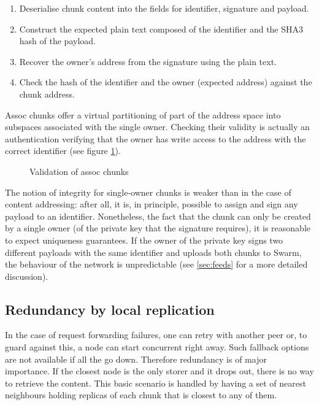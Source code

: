 \begin{enumerate}
    \item Deserialise chunk content into the fields for identifier, signature and payload.
    \item Construct the expected plain text composed of the identifier and the SHA3 hash of the payload.
    \item Recover the owner's address from the signature using the plain text.
    \item Check the hash of the identifier and the owner (expected address) against the chunk address.
\end{enumerate}

Assoc chunks offer a virtual partitioning of part of the address space into subspaces associated with the single owner. Checking their validity is actually an authentication verifying that the owner has write access to the address with the correct identifier (see figure \ref{fig:assoc-integrity}). 

\begin{figure}[htbp]
   \centering
   \caption[Validation of assoc chunks]{Validation of assoc chunks}
   \label{fig:assoc-integrity}
\end{figure}

The notion of integrity for single-owner chunks is weaker than in the case of content addressing: after all, it is, in principle, possible to assign and sign any payload to an identifier. Nonetheless, the fact that the chunk can only be created by a single owner (of the private key that the signature requires), it is reasonable to expect uniqueness guarantees. If the owner of the private key signs  two different payloads with the same identifier and uploads both chunks to Swarm, the behaviour of the network is unpredictable (see \ref{sec:feeds} for a  more detailed discussion).


\subsection{Redundancy by local replication}\label{sec:redundancy-by-local-replication}

In the case of request forwarding failures, one can retry with another peer or, to guard against this, a node can start concurrent  right away. Such fallback options are not available if all the  go down. Therefore redundancy is of major importance. If the closest node is the only storer and it drops out, there is no way to retrieve the content. This basic scenario is handled by having a set of nearest neighbours holding replicas of each chunk that is closest to any of them. 

